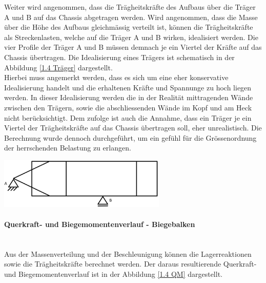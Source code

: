   Weiter wird angenommen, dass die Trägheitskräfte des Aufbaus über die Träger A und B auf das Chassis abgetragen werden. Wird angenommen, dass die Masse über die Höhe des Aufbaus gleichmässig verteilt ist, können die Trägheitskräfte als Streckenlasten, welche auf die Träger A und B wirken, idealisiert werden. Die vier Profile der Träger A und B müssen demnach je ein Viertel der Kräfte auf das Chassis übertragen. Die Idealisierung eines Trägers ist schematisch in der Abbildung \ref{1.4 Träger} dargestellt.\\
  Hierbei muss angemerkt werden, dass es sich um eine eher konservative Idealisierung handelt und die erhaltenen Kräfte und Spannunge zu hoch liegen werden. In dieser Idealisierung werden die in der Realität mittragenden Wände zwischen den Trägern, sowie die abschliessenden Wände im Kopf und am Heck nicht berücksichtigt. Dem zufolge ist auch die Annahme, dass ein Träger je ein Viertel der Trägheitskräfte auf das Chassis übertragen soll, eher unrealistisch. Die Berechnung wurde dennoch durchgeführt, um ein gefühl für die Grössenordnung der herrschenden Belastung zu erlangen.

  \begin{center}
    \includegraphics[width=0.6\textwidth]{04_Figures/1.4 Lagerung.png}
    \label{1.4 Lagerung}
  \end{center}

  \paragraph{Querkraft- und Biegemomentenverlauf - Biegebalken}\mbox{}\\
  Aus der Massenverteilung und der Beschleunigung können die Lagerreaktionen sowie die Trägheitskräfte berechnet werden. Der daraus resultierende Querkraft- und Biegemomentenverlauf ist in der Abbildung \ref{1.4 QM} dargestellt.

